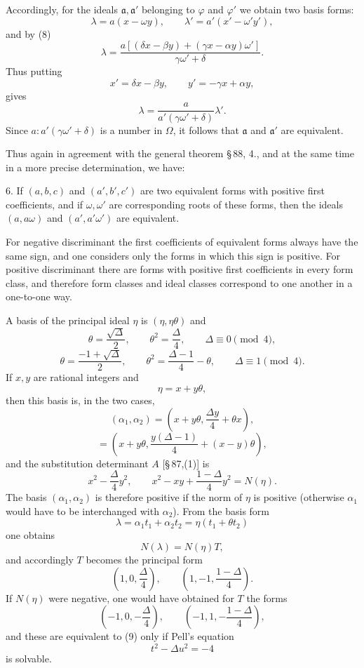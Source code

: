 \documentclass[11pt]{article}
\begin{document}
Accordingly, for the ideals $\mathfrak a,\mathfrak a'$ belonging to $\varphi$ and $\varphi'$ we obtain two basis forms:
\[
 \lambda=a(x-\omega y),
 \qquad
 \lambda'=a'(x'-\omega' y'),
\]
and by (8)
\[
 \lambda=\frac{a[(\delta x-\beta y)+(\gamma x-\alpha y)\omega']}{\gamma\omega'+\delta}.
\]
Thus putting
\[
 x'=\delta x-\beta y,\qquad y'=-\gamma x+\alpha y,
\]
gives
\[
 \lambda=\frac{a}{a'(\gamma\omega'+\delta)}\lambda'.
\]
Since $a:a'(\gamma\omega'+\delta)$ is a number in $\Omega$, it follows that $\mathfrak a$ and $\mathfrak a'$ are equivalent.

Thus again in agreement with the general theorem \S\,88, 4., and at the same time in a more precise determination, we have:

6. If $(a,b,c)$ and $(a',b',c')$ are two equivalent forms with positive first coefficients, and if $\omega,\omega'$ are corresponding roots of these forms, then the ideals $(a,a\omega)$ and $(a',a'\omega')$ are equivalent.

For negative discriminant the first coefficients of equivalent forms always have the same sign, and one considers only the forms in which this sign is positive. For positive discriminant there are forms with positive first coefficients in every form class, and therefore form classes and ideal classes correspond to one another in a one-to-one way.

A basis of the principal ideal $\eta$ is $(\eta,\eta\theta)$ and
\[
 \theta=\frac{\sqrt\Delta}{2},\qquad \theta^2=\frac{\Delta}{4},\qquad \Delta\equiv0\pmod4,
\]
\[
 \theta=\frac{-1+\sqrt\Delta}{2},\qquad \theta^2=\frac{\Delta-1}{4}-\theta,
 \qquad \Delta\equiv1\pmod4.
\]
If $x,y$ are rational integers and
\[
 \eta=x+y\theta,
\]
then this basis is, in the two cases,
\[
 (\alpha_1,\alpha_2)=\left(x+y\theta,\frac{\Delta y}{4}+\theta x\right),
\]
\[
 =\left(x+y\theta,\frac{y(\Delta-1)}{4}+(x-y)\theta\right),
\]
and the substitution determinant $A$ [\S\,87,(1)] is
\[
 x^2-\frac{\Delta}{4}y^2,
 \qquad
 x^2-xy+\frac{1-\Delta}{4}y^2=N(\eta).
\]
The basis $(\alpha_1,\alpha_2)$ is therefore positive if the norm of $\eta$ is positive (otherwise $\alpha_1$ would have to be interchanged with $\alpha_2$). From the basis form
\[
 \lambda=\alpha_1t_1+\alpha_2t_2=\eta(t_1+\theta t_2)
\]
one obtains
\[
 N(\lambda)=N(\eta)T,
\]
and accordingly $T$ becomes the principal form
\begin{equation}
 \left(1,0,\frac{\Delta}{4}\right),\qquad
 \left(1,-1,\frac{1-\Delta}{4}\right).
\tag{9}
\end{equation}
If $N(\eta)$ were negative, one would have obtained for $T$ the forms
\[
 \left(-1,0,-\frac{\Delta}{4}\right),\qquad
 \left(-1,1,-\frac{1-\Delta}{4}\right),
\]
and these are equivalent to (9) only if Pell's equation
\[
 t^2-\Delta u^2=-4
\]
is solvable.
\end{document}
